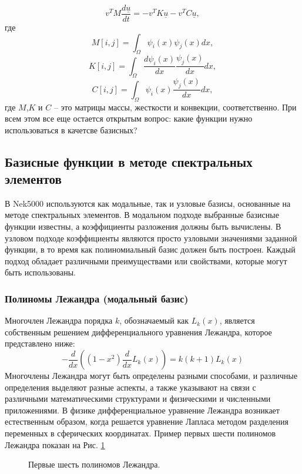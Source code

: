 %
\begin{equation}\label{galerkin_matrix}
    v^T M \frac{d\underline{u}}{dt} = -v^T K \underline{u} - v^TC\underline{u},
\end{equation}
%
где
%
\begin{equation}\label{galerkin_matrix2}
    M[i,j] = \int_\Omega \psi_i(x) \psi_j(x) dx,
\end{equation}
%
\begin{equation}\label{galerkin_matrix3}
    K[i,j] = \int_\Omega  \frac{d \psi_i(x)}{dx} \frac{\psi_j(x)}{dx} dx,
\end{equation}
%
\begin{equation}\label{galerkin_matrix4}
    C[i,j] = \int_\Omega \psi_i(x) \frac{\psi_j(x)}{dx} dx,
\end{equation}
%
где $M$,$K$ и $C$ -- это матрицы массы, жесткости и конвекции, соответственно.
%
При всем этом все еще остается открытым вопрос: какие функции нужно использоваться в качетсве базисных?

\subsection{Базисные функции в методе спектральных элементов}
%
В Nek5000 используются как модальные, так и узловые базисы, основанные на методе спектральных элементов.
%
В модальном подходе выбранные базисные функции известны, а коэффициенты разложения должны быть вычислены. 
%
В узловом подходе коэффициенты являются просто узловыми значениями заданной функции, в то время как полиномиальный базис должен быть построен. 
%
Каждый подход обладает различными преимуществами или свойствами, которые могут быть использованы.
%
\subsubsection{Полиномы Лежандра (модальный базис)}
%
Многочлен Лежандра порядка $k$, обозначаемый как $L_k(x)$, является собственным решением дифференциального уравнения Лежандра, которое представлено ниже:
\begin{equation*}
-\frac{d}{dx}((1-x^2)\frac{d}{dx}L_k(x)) = k(k+1)L_k(x)
\end{equation*}
%
Многочлены Лежандра могут быть определены разными способами, и различные определения выделяют разные аспекты, 
а также указывают на связи с различными математическими структурами и физическими и численными приложениями. 
%
В физике дифференциальное уравнение Лежандра возникает естественным образом, 
когда решается уравнение Лапласа методом разделения переменных в сферических координатах.
%
Пример первых шести полиномов Лежандра показан на Рис. \ref{fig:pols} 
\begin{figure}[ht]
    \caption{Первые шесть полиномов Лежандра.}\label{fig:pols}
\end{figure}

